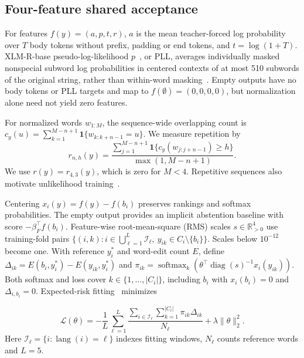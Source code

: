 \documentclass[conference,letterpaper]{IEEEtran}
\begin{document}
\subsection{Four-feature shared acceptance}
For features $f(y)=(a,p,t,r)$, $a$ is the mean teacher-forced log probability over $T$ body tokens without prefix, padding or end tokens, and $t=\log(1+T)$. XLM-R-base pseudo-log-likelihood $p$~\cite{xlmr,mlmscoring}, or PLL, averages individually masked nonspecial subword log probabilities in centered contexts of at most 510 subwords of the original string, rather than within-word masking~\cite{kauf2023}. Empty outputs have no body tokens or PLL targets and map to $f(\emptyset)=(0,0,0,0)$, but normalization alone need not yield zero features.

For normalized words $w_{1:M}$, the sequence-wide overlapping count is $c_y(u)=\sum_{k=1}^{M-n+1}\mathbf1\{w_{k:k+n-1}=u\}$. We measure repetition by
\begin{equation}
r_{n,h}(y)=\frac{\sum_{j=1}^{M-n+1}\mathbf1\{c_y(w_{j:j+n-1})\ge h\}}{\max(1,M-n+1)}.
\label{eq:repetition}
\end{equation}
We use $r(y)=r_{4,3}(y)$, which is zero for $M<4$. Repetitive sequences also motivate unlikelihood training~\cite{welleck2020}.

Centering $x_i(y) = f(y) - f(b_i)$ preserves rankings and softmax probabilities. The empty output provides an implicit abstention baseline with score $-\beta_F^\top f(b_i)$. Feature-wise root-mean-square (RMS) scales $s\in\mathbb R_{>0}^4$ use training-fold pairs $\{(i,k):i\in\bigcup_{\ell=1}^L\mathcal I_\ell,\ y_{ik}\in C_i\setminus\{b_i\}\}$. Scales below $10^{-12}$ become one. With reference $y_i^*$ and word-edit count $E$, define $\Delta_{ik}=E(b_i,y_i^*)-E(y_{ik},y_i^*)$ and $\pi_{ik}=\operatorname{softmax}_k(\theta^\top\operatorname{diag}(s)^{-1}x_i(y_{ik}))$. Both softmax and loss cover $k\in\{1,\ldots,|C_i|\}$, including $b_i$ with $x_i(b_i)=0$ and $\Delta_{i,b_i}=0$. Expected-risk fitting~\cite{mwer2018} minimizes

\begin{equation}
\mathcal L(\theta)=-\frac1L\sum_{\ell=1}^L\frac{\sum_{i\in\mathcal I_\ell}\sum_{k=1}^{|C_i|}\pi_{ik}\Delta_{ik}}{N_\ell}+\lambda\|\theta\|_2^2.
\label{eq:risk}
\end{equation}
Here $\mathcal I_\ell=\{i:\operatorname{lang}(i)=\ell\}$ indexes fitting windows, $N_\ell$ counts reference words and $L=5$.
\end{document}
